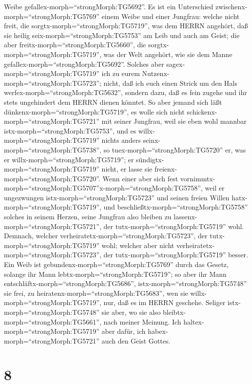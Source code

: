 Weibe gefallex-morph=``strongMorph:TG5692''. Es ist ein Unterschied
zwischenx-morph=``strongMorph:TG5769'' einem Weibe und einer Jungfrau:
 welche nicht freit, die
sorgtx-morph=``strongMorph:TG5719'', was dem HERRN angehört, daß sie
heilig seix-morph=``strongMorph:TG5753'' am Leib und auch am Geist; die
aber freitx-morph=``strongMorph:TG5660'', die
sorgtx-morph=``strongMorph:TG5719'', was der Welt angehört, wie sie dem
Manne gefallex-morph=``strongMorph:TG5692''.  Solches aber
sagex-morph=``strongMorph:TG5719'' ich zu eurem
Nutzenx-morph=``strongMorph:TG5723''; nicht, daß ich euch einen Strick
um den Hals werfex-morph=``strongMorph:TG5632'', sondern dazu, daß es
fein zugehe und ihr stets ungehindert dem HERRN dienen könntet.
 So aber jemand sich läßt
dünkenx-morph=``strongMorph:TG5719'', es wolle sich nicht
schickenx-morph=``strongMorph:TG5721'' mit seiner Jungfrau, weil sie
eben wohl mannbar istx-morph=``strongMorph:TG5753'', und es
willx-morph=``strongMorph:TG5719'' nichts anders
seinx-morph=``strongMorph:TG5738'', so tuex-morph=``strongMorph:TG5720''
er, was er willx-morph=``strongMorph:TG5719''; er
sündigtx-morph=``strongMorph:TG5719'' nicht, er lasse sie
freienx-morph=``strongMorph:TG5720''.  Wenn einer aber sich
fest
vornimmtx-morph=``strongMorph:TG5707''\textbar x-morph=``strongMorph:TG5758'',
weil er ungezwungen istx-morph=``strongMorph:TG5723'' und seinen freien
Willen hatx-morph=``strongMorph:TG5719'', und
beschließtx-morph=``strongMorph:TG5758'' solches in seinem Herzen, seine
Jungfrau also bleiben zu lassenx-morph=``strongMorph:TG5721'', der
tutx-morph=``strongMorph:TG5719'' wohl.  Demnach, welcher
verheiratetx-morph=``strongMorph:TG5723'', der
tutx-morph=``strongMorph:TG5719'' wohl; welcher aber nicht
verheiratetx-morph=``strongMorph:TG5723'', der
tutx-morph=``strongMorph:TG5719'' besser.  Ein Weib ist
gebundenx-morph=``strongMorph:TG5769'' durch das Gesetz, solange ihr
Mann lebtx-morph=``strongMorph:TG5719''; so aber ihr Mann
entschläftx-morph=``strongMorph:TG5686'',
istx-morph=``strongMorph:TG5748'' sie frei, zu
heiratenx-morph=``strongMorph:TG5683'', wen sie
willx-morph=``strongMorph:TG5719'', nur, daß es im HERRN geschehe.
 Seliger istx-morph=``strongMorph:TG5748'' sie aber, wo sie
also bleibtx-morph=``strongMorph:TG5661'', nach meiner Meinung. Ich
haltex-morph=``strongMorph:TG5719'' aber dafür, ich
habex-morph=``strongMorph:TG5721'' auch den Geist Gottes.

\hypertarget{section-7}{%
\section{8}\label{section-7}}

